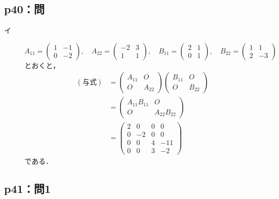 \documentclass[uplatex,dvipdfmx,a4paper,10pt,fleqn]{jsarticle}
\begin{document}
\subsection*{p40：問}

\begin{tleftbar}
    \begin{description}
        \item[イ] 
        \[
            A_{11} = \begin{pmatrix} 1 & -1 \\ 0 & -2 \end{pmatrix},\quad A_{22} = \begin{pmatrix} -2 & 3 \\ 1 & 1 \end{pmatrix} ,\quad B_{11} = \begin{pmatrix} 2 & 1 \\ 0 & 1\end{pmatrix} ,\quad B_{22}= \begin{pmatrix} 1 & 1 \\ 2 & -3 \end{pmatrix}
        \]
        とおくと，
        \begin{align*} 
            (\text{与式})&= \begin{pmatrix} A_{11} & O \\ O & A_{22} \end{pmatrix} \begin{pmatrix} B_{11} & O \\ O & B_{22} \end{pmatrix} \\
            & = \begin{pmatrix} A_{11} B_{11} & O \\ O & A_{22} B_{22} \end{pmatrix} \\
            & = \begin{pmatrix} 2 & 0 & 0 & 0 \\ 0 & -2 & 0 & 0 \\ 0 & 0 & 4 & -11 \\ 0 & 0 & 3 & -2 \end{pmatrix}
        \end{align*}
        である．
    \end{description}
\end{tleftbar}

\subsection*{p41：問1}
%
\end{document}
